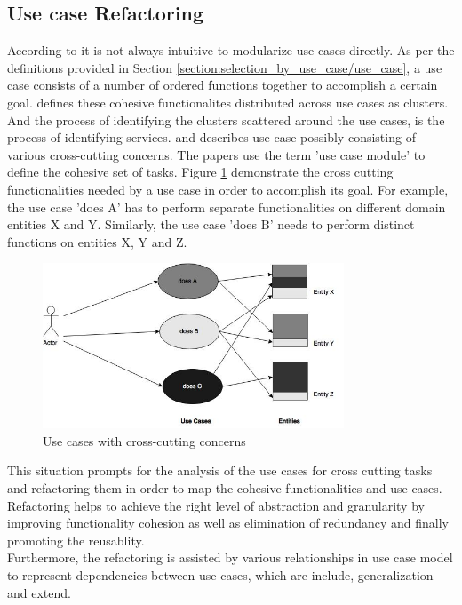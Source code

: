 \subsection{Use case Refactoring}\label{section:selection_by_use_case/use_case_refactoring}
According to \cite{Jacobson:1987aa} it is not always intuitive to modularize use cases directly. As per the definitions provided in Section \ref{section:selection_by_use_case/use_case}, a use case consists of a number of ordered functions together to accomplish a certain goal. \cite{Jacobson:1987aa} defines these cohesive functionalites distributed across use cases as clusters. And the process of identifying the clusters scattered around the use cases, is the process of identifying services. \cite{Ng:2004aa} and \cite{Jacobson:2003aa} describes use case possibly consisting of various cross-cutting concerns. The papers use the term 'use case module' to define the cohesive set of tasks. Figure \ref{fig:selection_by_use_case/use_case_one} demonstrate the cross cutting functionalities needed by a use case in order to accomplish its goal. For example, the use case 'does A' has to perform separate functionalities on different domain entities X and Y. Similarly, the use case 'does B' needs to perform distinct functions on entities X, Y and Z.
\begin{figure}[H]
\begin{center}
\includegraphics[width=0.8\textwidth]{figures/use-case-one}
\caption{Use cases with cross-cutting concerns \cite{Ng:2004aa}}
\label{fig:selection_by_use_case/use_case_one}
\end{center}
\end{figure}
This situation prompts for the analysis of the use cases for cross cutting tasks and refactoring them in order to map the cohesive functionalities and use cases. Refactoring helps to achieve the right level of abstraction and granularity by improving functionality cohesion as well as elimination of redundancy and finally promoting the reusablity. \cite{Doh:2007aa}
\\
Furthermore, the refactoring is assisted by various relationships in use case model to represent dependencies between use cases, which are include, generalization and extend. \cite{Ng:2004aa}
\\
